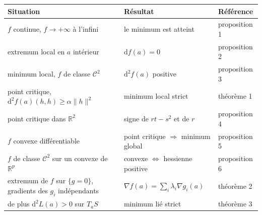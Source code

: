\documentclass[a4paper,twoside]{report}
\newcommand{\R}{\mathbb{R}}
\newcommand{\dd}{\mathrm{d}}                      %
\newcommand{\norme}[1]{\lVert #1 \rVert}         %
\newcommand{\Cc}{\mathcal{C}}                     %
\newcommand{\grad}{\nabla}                        %
\begin{document}
\begin{center}
\renewcommand{\arraystretch}{1.35}
\begin{tabularx}{15cm}{|>{\raggedright\arraybackslash}p{4.6cm}|>{\raggedright\arraybackslash}X|>{\centering\arraybackslash}p{2.4cm}|}
\hline
\rowcolor{couleurD!35} \textbf{Situation} & \textbf{Résultat} & \textbf{Référence} \\ \hline
$f$ continue, $f \to +\infty$ à l'infini & le minimum est atteint & proposition 1 \\ \hline
extremum local en $a$ intérieur & $\dd f(a) = 0$ & proposition 2 \\ \hline
minimum local, $f$ de classe $\Cc^{2}$ & $\dd^{2} f(a)$ positive & proposition 3 \\ \hline
point critique, $\dd^{2} f(a)(h, h) \geqslant \alpha\norme{h}^{2}$ & minimum local strict & théorème 1 \\ \hline
point critique dans $\R^{2}$ & signe de $rt - s^{2}$ et de $r$ & proposition 4 \\ \hline
$f$ convexe différentiable & point critique $\Rightarrow$ minimum global & proposition 5 \\ \hline
$f$ de classe $\Cc^{2}$ sur un convexe de $\R^{p}$ & convexe $\iff$ hessienne positive & proposition 6 \\ \hline
extremum de $f$ sur $\{g = 0\}$, gradients des $g_{i}$ indépendants & $\grad f(a) = \sum_{i}\lambda_{i}\grad g_{i}(a)$ & théorème 2 \\ \hline
de plus $\dd^{2} L(a) > 0$ sur $T_{a}S$ & minimum lié strict & théorème 3 \\ \hline
\end{tabularx}
\end{center}

\begin{center}
\end{center}
\end{document}
